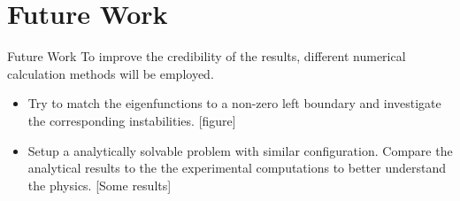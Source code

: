 \section{Future Work}
\begin{frame}{Future Work}
  To improve the credibility of the results, different numerical calculation methods will be employed.

  \begin{itemize}
      \item Try to match the eigenfunctions to a non-zero left boundary and investigate the corresponding instabilities.
        [figure]
      \item Setup a analytically solvable problem with similar configuration. Compare the analytical results to the the experimental computations to better understand the physics.
        [Some results]
  \end{itemize}
\end{frame}
